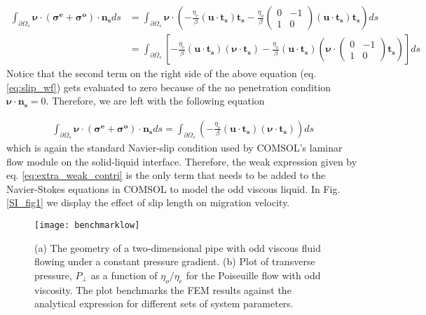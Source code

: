 \documentclass[%
 amsmath,amssymb,
 aps,
10.5pt]{revtex4-2}
\begin{document}
\begin{align}
    \int_{\partial \Omega_s} \boldsymbol{\nu} \cdot (\boldsymbol{\sigma^e}+\boldsymbol{\sigma^o}) \cdot \boldsymbol{n_s} ds &= \int_{\partial \Omega_s}\boldsymbol{\nu} \cdot \left( -\frac{\eta_e}{\beta} (\boldsymbol{u} \cdot \boldsymbol{t_s}) \boldsymbol{t_s} - \frac{\eta_o}{\beta} \begin{pmatrix} 0 & -1 \\ 1 & 0 \end{pmatrix} (\boldsymbol{u} \cdot \boldsymbol{t_s}) \boldsymbol{t_s} \right)ds \nonumber\\
    &= \int_{\partial \Omega_s}\left[-\frac{\eta_e}{\beta} (\boldsymbol{u} \cdot \boldsymbol{t_s}) (\boldsymbol{\nu} \cdot \boldsymbol{t_s}) - \frac{\eta_o}{\beta}(\boldsymbol{u} \cdot \boldsymbol{t_s}) \left(\boldsymbol{\nu} \cdot \begin{pmatrix} 0 & -1 \\ 1 & 0 \end{pmatrix} \boldsymbol{t_s}\right) \right] ds \label{eq:slip_wf}
\end{align}
Notice that the second term on the right side of the above equation (eq. \ref{eq:slip_wf}) gets evaluated to zero because of the no penetration condition $\boldsymbol{\nu} \cdot \boldsymbol{n_s} = 0$. Therefore, we are left with the following equation

\begin{align}
    \int_{\partial \Omega_s} \boldsymbol{\nu} \cdot (\boldsymbol{\sigma^e}+\boldsymbol{\sigma^o}) \cdot \boldsymbol{n_s} ds = \int_{\partial \Omega_s}\left(-\frac{\eta_e}{\beta} (\boldsymbol{u} \cdot \boldsymbol{t_s}) (\boldsymbol{\nu} \cdot \boldsymbol{t_s}) \right) ds  
\end{align}
which is again the standard Navier-slip condition used by COMSOL's laminar flow module on the solid-liquid interface. Therefore, the weak expression given by eq. \ref{eq:extra_weak_contri} is the only term that needs to be added to the Navier-Stokes equations in COMSOL to model the odd viscous liquid.
In Fig. \ref{SI_fig1} we display the effect of slip length on migration velocity. 



\begin{figure}
    \centering
    \texttt{[image: benchmarklow]}
    \caption{(a) The geometry of a two-dimensional pipe with odd viscous fluid flowing under a constant pressure gradient. (b) Plot of transverse pressure, $P_\perp$ as a function of $\eta_o/\eta_e$ for the Poiseuille flow with odd viscosity. The plot benchmarks the FEM results against the analytical expression for different sets of system parameters. }
    \label{fig:benchmark}
\end{figure}
\end{document}
